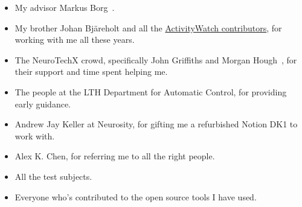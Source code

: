 \begin{itemize}
 \item My advisor Markus Borg~.
 \item My brother Johan Bjäreholt and all the \href{https://activitywatch.net/contributors/}{ActivityWatch contributors}, for working with me all these years.
 \item The NeuroTechX crowd, specifically John Griffiths and Morgan Hough~, for their support and time spent helping me.
 \item The people at the LTH Department for Automatic Control, for providing early guidance.
 \item Andrew Jay Keller at Neurosity, for gifting me a refurbished Notion DK1 to work with.
 \item Alex K. Chen, for referring me to all the right people.
 \item All the test subjects.
 \item Everyone who's contributed to the open source tools I have used.
\end{itemize}
